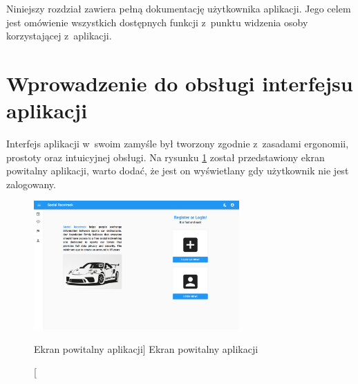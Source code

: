 \documentclass[../Kamil_Kowalewski_Main.tex]{subfiles}
\begin{document}
 {

    Niniejszy rozdział zawiera pełną dokumentację użytkownika aplikacji. Jego celem
    jest omówienie wszystkich dostępnych funkcji z~punktu widzenia osoby korzystającej
    z~aplikacji.

    \section{Wprowadzenie do obsługi interfejsu aplikacji}
    \label{chapter5:dok_uzytkownika:wprowadzenie_interface}{
        Interfejs aplikacji w~swoim zamyśle był tworzony zgodnie z~zasadami ergonomii,
        prostoty oraz intuicyjnej obsługi. Na rysunku
        \ref{chapter5:dok_uzytkownika:wprowadzenie_interface:ui_intro}
        został przedstawiony ekran powitalny aplikacji, warto dodać, że jest
        on wyświetlany gdy użytkownik nie jest zalogowany.
        \begin{figure}[H]
            \centering
            \includegraphics[width=0.7\textwidth, keepaspectratio]
            {img/chapter5/intro/UI_intro.png}
            \caption
            [Ekran powitalny aplikacji]
            {Ekran powitalny aplikacji}
            \label{chapter5:dok_uzytkownika:wprowadzenie_interface:ui_intro}
        \end{figure}

}}
\end{document}

